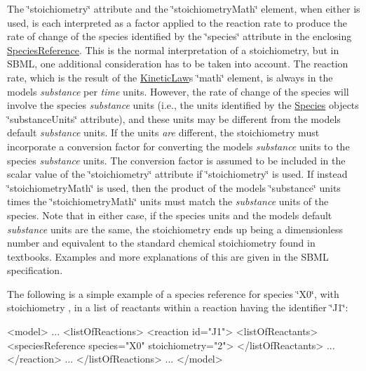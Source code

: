 The \char`\"{}stoichiometry\char`\"{} attribute and the \char`\"{}stoichiometry\+Math\char`\"{} element, when either is used, is each interpreted as a factor applied to the reaction rate to produce the rate of change of the species identified by the \char`\"{}species\char`\"{} attribute in the enclosing \hyperlink{class_species_reference}{Species\+Reference}. This is the normal interpretation of a stoichiometry, but in S\+B\+ML, one additional consideration has to be taken into account. The reaction rate, which is the result of the \hyperlink{class_kinetic_law}{Kinetic\+Law}\textquotesingle{}s \char`\"{}math\char`\"{} element, is always in the model\textquotesingle{}s {\itshape substance} per {\itshape time} units. However, the rate of change of the species will involve the species\textquotesingle{} {\itshape substance} units (i.\+e., the units identified by the \hyperlink{class_species}{Species} object\textquotesingle{}s \char`\"{}substance\+Units\char`\"{} attribute), and these units may be different from the model\textquotesingle{}s default {\itshape substance} units. If the units {\itshape are} different, the stoichiometry must incorporate a conversion factor for converting the model\textquotesingle{}s {\itshape substance} units to the species\textquotesingle{} {\itshape substance} units. The conversion factor is assumed to be included in the scalar value of the \char`\"{}stoichiometry\char`\"{} attribute if \char`\"{}stoichiometry\char`\"{} is used. If instead \char`\"{}stoichiometry\+Math\char`\"{} is used, then the product of the model\textquotesingle{}s \char`\"{}substance\char`\"{} units times the \char`\"{}stoichiometry\+Math\char`\"{} units must match the {\itshape substance} units of the species. Note that in either case, if the species\textquotesingle{} units and the model\textquotesingle{}s default {\itshape substance} units are the same, the stoichiometry ends up being a dimensionless number and equivalent to the standard chemical stoichiometry found in textbooks. Examples and more explanations of this are given in the S\+B\+ML specification.

The following is a simple example of a species reference for species {\ttfamily \char`\"{}\+X0\char`\"{}}, with stoichiometry {}, in a list of reactants within a reaction having the identifier {\ttfamily \char`\"{}\+J1\char`\"{}}\+: \begin{DoxyVerb}<model>
    ...
    <listOfReactions>
        <reaction id="J1">
            <listOfReactants>
                <speciesReference species="X0" stoichiometry="2">
            </listOfReactants>
            ...
        </reaction>
        ...
    </listOfReactions>
    ...
</model>
\end{DoxyVerb}


